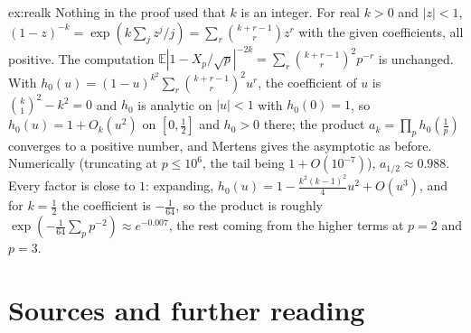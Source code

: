 \begin{solution}{ex:realk}
\idea Nothing in the proof used that $k$ is an integer.
\writeup For real $k>0$ and $|z|<1$, $(1-z)^{-k}=\exp(k\sum_jz^j/j)=\sum_r\binom{k+r-1}rz^r$ with the given coefficients, all positive. The computation $\mathbb E|1-X_p/\sqrt p|^{-2k}=\sum_r\binom{k+r-1}r^2p^{-r}$ is unchanged. With $h_0(u)=(1-u)^{k^2}\sum_r\binom{k+r-1}r^2u^r$, the coefficient of $u$ is $\binom k1^2-k^2=0$ and $h_0$ is analytic on $|u|<1$ with $h_0(0)=1$, so $h_0(u)=1+O_k(u^2)$ on $[0,\frac12]$ and $h_0>0$ there; the product $a_k=\prod_ph_0(\frac1p)$ converges to a positive number, and Mertens gives the asymptotic as before. Numerically (truncating at $p\le10^6$, the tail being $1+O(10^{-7})$), $a_{1/2}\approx0.988$. Every factor is close to $1$: expanding, $h_0(u)=1-\frac{k^2(k-1)^2}{4}u^2+O(u^3)$, and for $k=\frac12$ the coefficient is $-\frac1{64}$, so the product is roughly $\exp(-\frac1{64}\sum_pp^{-2})\approx e^{-0.007}$, the rest coming from the higher terms at $p=2$ and $p=3$.
\end{solution}

\section*{Sources and further reading}

